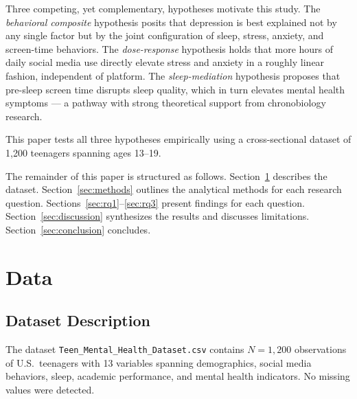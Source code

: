 \documentclass[11pt]{article}
\begin{document}
Three competing, yet complementary, hypotheses motivate this study.  The \emph{behavioral
composite} hypothesis posits that depression is best explained not by any single factor but
by the joint configuration of sleep, stress, anxiety, and screen-time behaviors.  The
\emph{dose-response} hypothesis holds that more hours of daily social media use directly
elevate stress and anxiety in a roughly linear fashion, independent of platform.  The
\emph{sleep-mediation} hypothesis proposes that pre-sleep screen time disrupts sleep
quality, which in turn elevates mental health symptoms --- a pathway with strong theoretical
support from chronobiology research.

This paper tests all three hypotheses empirically using a cross-sectional dataset of
1{,}200 teenagers spanning ages 13--19.

The remainder of this paper is structured as follows.  Section~\ref{sec:data} describes the
dataset.  Section~\ref{sec:methods} outlines the analytical methods for each research question.
Sections~\ref{sec:rq1}--\ref{sec:rq3} present findings for each question.
Section~\ref{sec:discussion} synthesizes the results and discusses limitations.
Section~\ref{sec:conclusion} concludes.

\section{Data}
\label{sec:data}

\subsection{Dataset Description}

The dataset \texttt{Teen\_Mental\_Health\_Dataset.csv} contains $N = 1{,}200$ observations of
U.S.\ teenagers with 13 variables spanning demographics, social media behaviors, sleep, academic
performance, and mental health indicators.  No missing values were detected.
\end{document}
